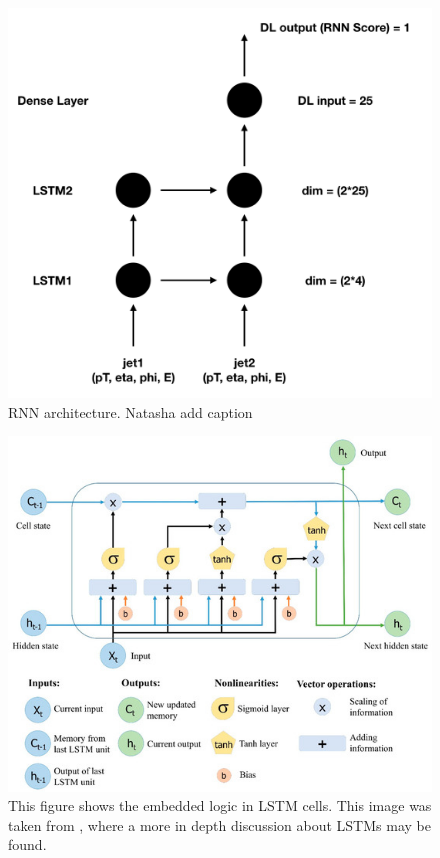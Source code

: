 \begin{figure}[h!]
  \centering
  \includegraphics[width=\hsize]{figures/Analysis/rnn_architecture.png}
  \caption{RNN architecture. Natasha add caption} 
  \label{fig:rnn_architecture}
\end{figure}
\FloatBarrier

\begin{figure}[h!]
  \centering
  \includegraphics[width=\hsize]{figures/Analysis/LSTM_structure.jpeg}
  \caption{This figure shows the embedded logic in LSTM cells. This image was taken from \cite{lstmstruct}, where a more in depth discussion about LSTMs may be found. }
  \label{fig:rnn_architecture}
\end{figure}
\FloatBarrier



